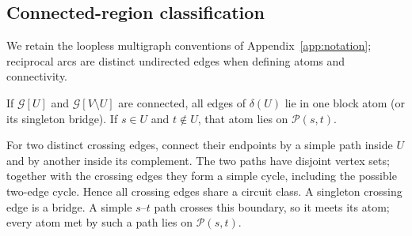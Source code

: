 \subsection{Connected-region classification}\label{app:connectedproof}
We retain the loopless multigraph conventions of
Appendix~\ref{app:notation}; reciprocal arcs are distinct undirected
edges when defining atoms and connectivity.

\begin{lemma}\label{lem:bondlocal}
If $\mathcal G[U]$ and $\mathcal G[V\setminus U]$ are connected, all edges of
$\delta(U)$ lie in one block atom (or its singleton bridge).
If $s\in U$ and $t\notin U$, that atom lies on $\mathcal P(s,t)$.
\end{lemma}
\begin{pf}
For two distinct crossing edges, connect their endpoints by a simple
path inside $U$ and by another inside its complement. The two paths
have disjoint vertex sets; together with the crossing edges they form
a simple cycle, including the possible two-edge cycle. Hence all
crossing edges share a circuit class. A singleton crossing edge is a
bridge. A simple $s$--$t$ path crosses this boundary, so it meets its
atom; every atom met by such a path lies on $\mathcal P(s,t)$.
\end{pf}


